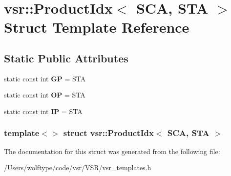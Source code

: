 \hypertarget{structvsr_1_1_product_idx_3_01_s_c_a_00_01_s_t_a_01_4}{\section{vsr\-:\-:Product\-Idx$<$ S\-C\-A, S\-T\-A $>$ Struct Template Reference}
\label{structvsr_1_1_product_idx_3_01_s_c_a_00_01_s_t_a_01_4}
}
\subsection*{Static Public Attributes}
\begin{DoxyCompactItemize}
\item 
\hypertarget{structvsr_1_1_product_idx_3_01_s_c_a_00_01_s_t_a_01_4_a883454955673e14de53c50729567f44c}{static const int {\bfseries G\-P} = S\-T\-A}\label{structvsr_1_1_product_idx_3_01_s_c_a_00_01_s_t_a_01_4_a883454955673e14de53c50729567f44c}

\item 
\hypertarget{structvsr_1_1_product_idx_3_01_s_c_a_00_01_s_t_a_01_4_a53cd527032f0c1a68aa0dc6b168c0b95}{static const int {\bfseries O\-P} = S\-T\-A}\label{structvsr_1_1_product_idx_3_01_s_c_a_00_01_s_t_a_01_4_a53cd527032f0c1a68aa0dc6b168c0b95}

\item 
\hypertarget{structvsr_1_1_product_idx_3_01_s_c_a_00_01_s_t_a_01_4_a5c4488aff2c72dd243745e35f5c074a4}{static const int {\bfseries I\-P} = S\-T\-A}\label{structvsr_1_1_product_idx_3_01_s_c_a_00_01_s_t_a_01_4_a5c4488aff2c72dd243745e35f5c074a4}

\end{DoxyCompactItemize}
\subsubsection*{template$<$$>$ struct vsr\-::\-Product\-Idx$<$ S\-C\-A, S\-T\-A $>$}



The documentation for this struct was generated from the following file\-:\begin{DoxyCompactItemize}
\item 
/\-Users/wolftype/code/vsr/\-V\-S\-R/vsr\-\_\-templates.\-h\end{DoxyCompactItemize}
